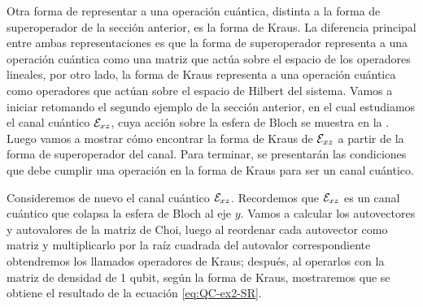Otra forma de representar a una operación cuántica, distinta a la
forma de superoperador de la sección anterior, es la forma de Kraus. 
La diferencia principal entre ambas representaciones 
es que la forma de superoperador
representa a una operación cuántica como una matriz que 
actúa sobre el espacio de los operadores lineales, por otro lado,
la forma de Kraus representa a una operación cuántica 
como operadores que actúan sobre el espacio de 
Hilbert del sistema. Vamos a iniciar retomando el segundo 
ejemplo de la sección anterior, en el cual estudiamos 
el canal cuántico $\mathcal{E}_{xz}$, cuya acción sobre la esfera
de Bloch se muestra en la .
Luego vamos a mostrar cómo encontrar la forma de Kraus de $\mathcal{E}_{xz}$ 
a partir de la forma de superoperador del canal.
Para terminar, se presentarán las condiciones 
que debe cumplir una operación en la forma de Kraus para
ser un canal cuántico.

Consideremos de nuevo el canal cuántico $\mathcal{E}_{xz}$.
Recordemos que $\mathcal{E}_{xz}$ es un canal cuántico
que colapsa la esfera de Bloch al eje $y$. 
Vamos a calcular los autovectores y autovalores de la 
matriz de Choi, luego al reordenar
cada autovector como matriz y multiplicarlo por la raíz cuadrada
del autovalor correspondiente obtendremos los llamados 
operadores de Kraus; después, al operarlos con la matriz 
de densidad de 1 qubit, según 
la forma de Kraus, mostraremos que se obtiene el 
resultado de la ecuación \eqref{eq:QC-ex2-SR}.

